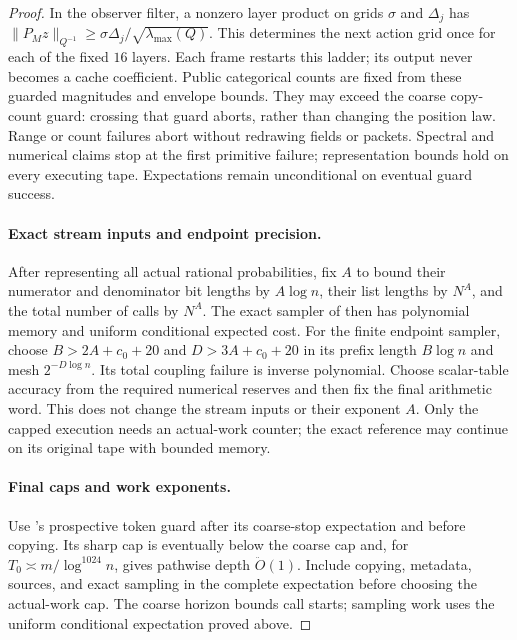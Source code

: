 \documentclass[11pt]{article}
\theoremstyle{remark}
\newcommand{\norm}[1]{\lVert#1\rVert}
\renewcommand{\O}{\ddot{O}}
\begin{document}
\begin{proof}
In the observer filter, a nonzero layer product on grids $\sigma$ and $\Delta_j$
has $\norm{P_Mz}_{Q^{-1}}\ge\sigma\Delta_j/ \sqrt{\lambda_{\max}(Q)}$.
This determines the next action grid once for each of the fixed $16$ layers.
Each frame restarts this ladder; its output never becomes a cache coefficient.
Public categorical counts are fixed from these guarded magnitudes and envelope
bounds.
They may exceed the coarse copy-count guard: crossing that guard aborts, rather
than changing the position law.
Range or count failures abort without redrawing fields or packets.
Spectral and numerical claims stop at the first primitive failure;
representation bounds hold on every executing tape.
Expectations remain unconditional on eventual guard success.

\paragraph{Exact stream inputs and endpoint precision.}
After representing all actual rational probabilities, fix $A$ to bound their
numerator and denominator bit lengths by $A\log n$, their list lengths by $N^A$, and
the total number of calls by $N^A$.
The exact sampler of  then has polynomial memory and
uniform conditional expected cost.
For the finite endpoint sampler, choose $B>2A+c_0+20$ and $D>3A+c_0+20$ in its
prefix length $B\log n$ and mesh $2^{-D\log n}$.
Its total coupling failure is inverse polynomial.
Choose scalar-table accuracy from the required numerical reserves and then fix
the final arithmetic word.
This does not change the stream inputs or their exponent $A$.
Only the capped execution needs an actual-work counter; the exact reference may
continue on its original tape with bounded memory.

\paragraph{Final caps and work exponents.}
Use 's prospective token guard after its coarse-stop
expectation and before copying.
Its sharp cap is eventually below the coarse cap and, for $T_0\asymp
m/\log^{1024} n$, gives pathwise depth $\O(1)$.
Include copying, metadata, sources, and exact sampling in the complete
expectation before choosing the actual-work cap.
The coarse horizon bounds call starts; sampling work uses the uniform
conditional expectation proved above.


\end{proof}
\end{document}
